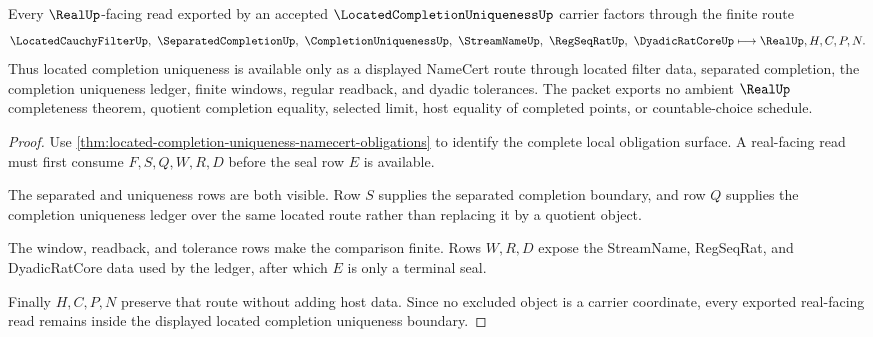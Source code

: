 \begin{theorem}
\label{thm:located-completion-uniqueness-real-seal-nonescape}
Every $\RealUp$-facing read exported by an accepted $\LocatedCompletionUniquenessUp$ carrier factors through the finite route
$$
\LocatedCauchyFilterUp,\ \SeparatedCompletionUp,\ \CompletionUniquenessUp,\ \StreamNameUp,\ \RegSeqRatUp,\ \DyadicRatCoreUp
\longmapsto
\RealUp,H,C,P,N .
$$
Thus located completion uniqueness is available only as a displayed NameCert route through located filter data, separated completion, the completion uniqueness ledger, finite windows, regular readback, and dyadic tolerances. The packet exports no ambient $\RealUp$ completeness theorem, quotient completion equality, selected limit, host equality of completed points, or countable-choice schedule.
\end{theorem}
\begin{proof}
Use \autoref{thm:located-completion-uniqueness-namecert-obligations} to identify the complete local obligation surface. A real-facing read must first consume $F,S,Q,W,R,D$ before the seal row $E$ is available.

The separated and uniqueness rows are both visible. Row $S$ supplies the separated completion boundary, and row $Q$ supplies the completion uniqueness ledger over the same located route rather than replacing it by a quotient object.

The window, readback, and tolerance rows make the comparison finite. Rows $W,R,D$ expose the StreamName, RegSeqRat, and DyadicRatCore data used by the ledger, after which $E$ is only a terminal seal.

Finally $H,C,P,N$ preserve that route without adding host data. Since no excluded object is a carrier coordinate, every exported real-facing read remains inside the displayed located completion uniqueness boundary.
\end{proof}



